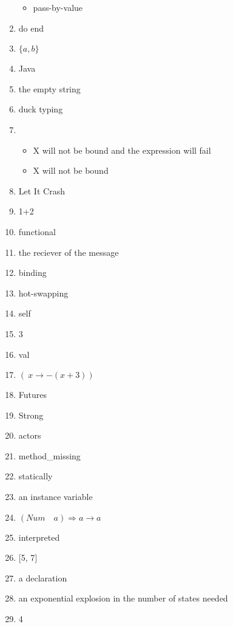 \documentclass{exam}
\begin{document}
\begin{enumerate}
\begin{itemize}
\item pass-by-value
\end{itemize}
\item do end
\item $\{a,b\}$
\item Java
\item the empty string
\item duck typing
\item \begin{itemize}
\item X will not be bound and the expression will fail
\item X will not be bound
\end{itemize}
\item Let It Crash
\item 1+2
\item functional
\item the reciever of the message
\item binding
\item hot-swapping
\item self
\item 3
\item val
\item $(\ x \rightarrow - (x + 3))$
\item Futures
\item Strong
\item actors
\item method\_missing
\item statically
\item an instance variable
\item $(Num \quad a) \Rightarrow a \rightarrow a$
\item interpreted
\item $\lbrack$5, 7$\rbrack$
\item a declaration
\item an exponential explosion in the number of states needed
\item 4
\end{enumerate}
\end{document}
